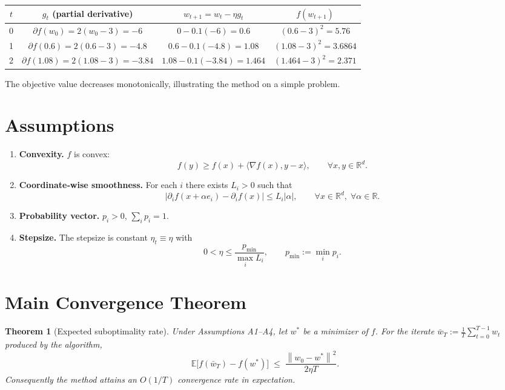 \documentclass{article}
\newcommand{\E}{\mathbb{E}}
\newcommand{\R}{\mathbb{R}}
\newcommand{\norm}[1]{\left\|#1\right\|}
\newcommand{\ip}[2]{\langle #1,#2\rangle}
\newtheorem{theorem}{Theorem}
\begin{document}
\begin{center}
\begin{tabular}{c|c|c|c}
$t$ & $g_t$ (partial derivative) & $w_{t+1}=w_t-\eta g_t$ & $f(w_{t+1})$\\ \hline
0 & $\partial f(w_0)=2(w_0-3)=-6$ & $0-0.1(-6)=0.6$ & $(0.6-3)^2=5.76$\\
1 & $\partial f(0.6)=2(0.6-3)=-4.8$ & $0.6-0.1(-4.8)=1.08$ & $(1.08-3)^2=3.6864$\\
2 & $\partial f(1.08)=2(1.08-3)=-3.84$ & $1.08-0.1(-3.84)=1.464$ & $(1.464-3)^2=2.371$\\
\end{tabular}
\end{center}
The objective value decreases monotonically, illustrating the method on a simple problem.

\newpage
\section*{Assumptions}
\begin{enumerate}[label={A\arabic*}.]
\item \textbf{Convexity.} $f$ is convex:
\[
f(y)\ge f(x)+\ip{\nabla f(x)}{y-x},\qquad\forall x,y\in\R^{d}.
\tag{A1}
\]
\item \textbf{Coordinate‑wise smoothness.} For each $i$ there exists $L_i>0$ such that
\[
\big|\partial_i f(x+\alpha e_i)-\partial_i f(x)\big|\le L_i|\alpha|,\qquad\forall x\in\R^{d},\;\forall\alpha\in\R.
\tag{A2}
\]
\item \textbf{Probability vector.} $p_i>0$, $\sum_i p_i=1$.
\item \textbf{Stepsize.} The stepsize is constant $\eta_t\equiv\eta$ with
\[
0<\eta\le\frac{p_{\min}}{\displaystyle\max_i L_i},
\qquad p_{\min}:=\min_i p_i.
\tag{A4}
\]
\end{enumerate}

\section*{Main Convergence Theorem}
\begin{theorem}[Expected suboptimality rate]\label{thm:main}
Under Assumptions A1–A4, let $w^*$ be a minimizer of $f$. For the iterate
$\bar w_T:=\frac1T\sum_{t=0}^{T-1}w_t$ produced by the algorithm,
\[
\E\!\big[f(\bar w_T)-f(w^*)\big]\;\le\;
\frac{\norm{w_0-w^*}^2}{2\eta T}.
\tag{3}
\]
Consequently the method attains an $O(1/T)$ convergence rate in expectation.
\end{theorem}
\end{document}
